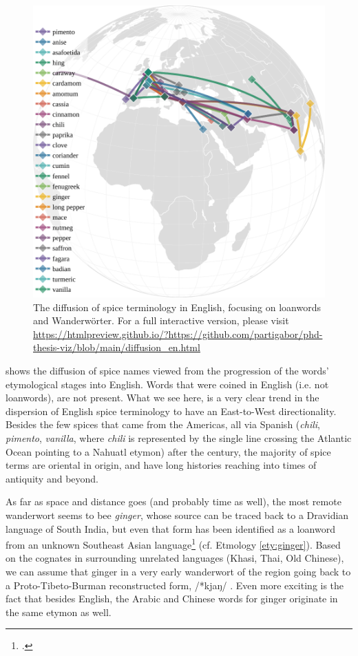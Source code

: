 \begin{figure}[ht!]
  \includegraphics[width=\linewidth]{imgs/plots/diffusion_en.pdf}
  \caption[The diffusion of spice terminology in English.]{The diffusion of spice terminology in English, focusing on loanwords and Wanderwörter. For a full interactive version, please visit \url{https://htmlpreview.github.io/?https://github.com/partigabor/phd-thesis-viz/blob/main/diffusion_en.html}}
  \label{fig:diffusion_en}
\end{figure}

 shows the diffusion of spice names viewed from the progression of the words' etymological stages into English. Words that were coined in English (i.e. not loanwords), are not present. What we see here, is a very clear trend in the dispersion of English spice terminology to have an East-to-West directionality. Besides the few spices that came from the Americas, all via Spanish (\textit{chili}, \textit{pimento}, \textit{vanilla}, where \textit{chili} is represented by the single line crossing the Atlantic Ocean pointing to a Nahuatl etymon) after the  century, the majority of spice terms are oriental in origin, and have long histories reaching into times of antiquity and beyond. 

As far as space and distance goes (and probably time as well), the most remote \gls{wanderwort} seems to bee \textit{ginger}, whose source can be traced back to a Dravidian language of South India, but even that form has been identified as a loanword from an unknown Southeast Asian language\footcite[ginger]{oed} (cf. Etmology \ref{ety:ginger}). Based on the cognates in surrounding unrelated languages (Khasi, Thai, Old Chinese), we can assume that ginger in a very early \gls{wanderwort} of the region going back to a Proto-Tibeto-Burman reconstructed form, /*kjaŋ/ \autocite[302]{matisoff_handbook_2003}. Even more exciting is the fact that besides English, the Arabic and Chinese words for ginger originate in the same etymon as well.

